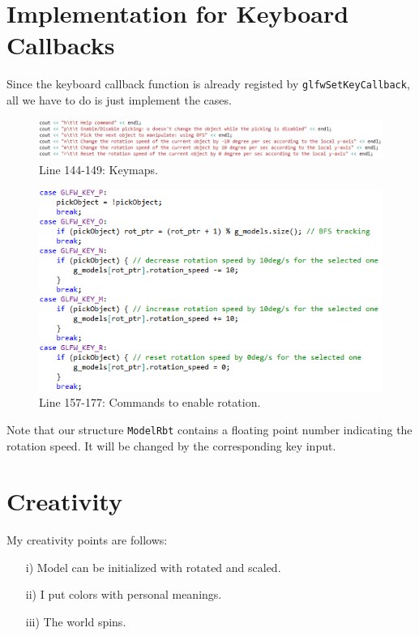 \documentclass[11pt]{article}
\begin{document}
\section{Implementation for Keyboard Callbacks} \label{sec:5}
Since the keyboard callback function is already registed by \texttt{glfwSetKeyCallback}, all we have to do is just implement the cases.
\begin{figure}[htb]
	\begin{center}
		\includegraphics[width=1.0\linewidth]{tooltip1.png}
	\end{center}
	\caption{Line 144-149: Keymaps.}
\end{figure}
\newpage
\begin{figure}[htb]
	\begin{center}
		\includegraphics[width=1.0\linewidth]{command1.png}
	\end{center}
	\caption{Line 157-177: Commands to enable rotation.}
\end{figure}
Note that our structure \texttt{ModelRbt} contains a floating point number indicating the rotation speed. It will be changed by the corresponding key input.

\section{Creativity} \label{sec:6}
My creativity points are follows:
\begin{itemize}
	\item [i)] Model can be initialized with rotated and scaled.
	\item [ii)] I put colors with personal meanings.
	\item [iii)] The world spins.
\end{itemize}
\end{document}
